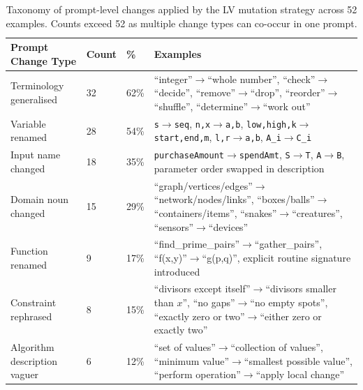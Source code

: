 \documentclass{article}
\begin{document}
\medskip

\begin{table}[ht]
\centering
\caption{Taxonomy of prompt-level changes applied by the LV mutation strategy across 52 examples. Counts exceed 52 as multiple change types can co-occur in one prompt.}
\label{tab:prompt-changes}
\begin{tabular}{p{4.8cm}p{1.0cm}p{1.0cm}p{7.6cm}}
\toprule
\textbf{Prompt Change Type} & \textbf{Count} & \textbf{\%} & \textbf{Examples} \\
\midrule

\rowcolor[RGB]{220,235,255}
Terminology generalised & 32 & 62\% &
``integer''$\to$``whole number'', ``check''$\to$``decide'', ``remove''$\to$``drop'', ``reorder''$\to$``shuffle'', ``determine''$\to$``work out'' \\
\addlinespace[2pt]

\rowcolor[RGB]{220,255,220}
Variable renamed & 28 & 54\% &
\texttt{s}$\to$\texttt{seq}, \texttt{n,x}$\to$\texttt{a,b}, \texttt{low,high,k}$\to$\texttt{start,end,m}, \texttt{l,r}$\to$\texttt{a,b}, \texttt{A\_i}$\to$\texttt{C\_i} \\
\addlinespace[2pt]

\rowcolor[RGB]{240,230,255}
Input name changed & 18 & 35\% &
\texttt{purchaseAmount}$\to$\texttt{spendAmt}, \texttt{S}$\to$\texttt{T}, \texttt{A}$\to$\texttt{B}, parameter order swapped in description \\
\addlinespace[2pt]

\rowcolor[RGB]{255,240,200}
Domain noun changed & 15 & 29\% &
``graph/vertices/edges''$\to$``network/nodes/links'', ``boxes/balls''$\to$``containers/items'', ``snakes''$\to$``creatures'', ``sensors''$\to$``devices'' \\
\addlinespace[2pt]

\rowcolor[RGB]{240,220,255}
Function renamed & 9 & 17\% &
``find\_prime\_pairs''$\to$``gather\_pairs'', ``f(x,y)''$\to$``g(p,q)'', explicit routine signature introduced \\
\addlinespace[2pt]

\rowcolor[RGB]{255,245,200}
Constraint rephrased & 8 & 15\% &
``divisors except itself''$\to$``divisors smaller than $x$'', ``no gaps''$\to$``no empty spots'', ``exactly zero or two''$\to$``either zero or exactly two'' \\
\addlinespace[2pt]

\rowcolor[RGB]{230,230,230}
Algorithm description vaguer & 6 & 12\% &
``set of values''$\to$``collection of values'', ``minimum value''$\to$``smallest possible value'', ``perform operation''$\to$``apply local change'' \\

\bottomrule
\end{tabular}
\end{table}
\end{document}

